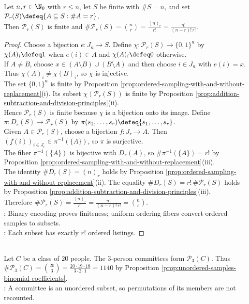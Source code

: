 \begin{proposition} \label{prop:unordered-samples-binomial-coefficients} \\
Let $n,r\in\N_0$ with $r\leq n$, let $S$ be finite with $\#S=n$, and set $\mathcal{P}_r(S)\defeq\{A\subseteq S:\#A=r\}$.\\
Then $\mathcal{P}_r(S)$ is finite and $\#\mathcal{P}_r(S)=\binom{n}{r}=\frac{(n)_r}{r!}=\frac{n!}{(n-r)!\,r!}$.
\begin{proof}
Choose a bijection $e:J_n\to S$. Define $\chi:\mathcal{P}_r(S)\to\{0,1\}^n$ by $\chi(A)_i\defeq1$ when $e(i)\in A$ and $\chi(A)_i\defeq0$ otherwise.\\
If $A\neq B$, choose $x\in(A\setminus B)\cup(B\setminus A)$ and then choose $i\in J_n$ with $e(i)=x$. Thus $\chi(A)_i\neq\chi(B)_i$, so $\chi$ is injective.\\
The set $\{0,1\}^n$ is finite by Proposition \ref{prop:ordered-sampling-with-and-without-replacement}(i). Its subset $\chi(\mathcal{P}_r(S))$ is finite by Proposition \ref{prop:addition-subtraction-and-division-principles}(ii).\\
Hence $\mathcal{P}_r(S)$ is finite because $\chi$ is a bijection onto its image. Define $\pi:D_r(S)\to\mathcal{P}_r(S)$ by $\pi(s_1,\ldots,s_r)\defeq\{s_1,\ldots,s_r\}$.\\
Given $A\in\mathcal{P}_r(S)$, choose a bijection $f:J_r\to A$. Then $(f(i))_{i\in J_r}\in\pi^{-1}(\{A\})$, so $\pi$ is surjective.\\
The fiber $\pi^{-1}(\{A\})$ is bijective with $D_r(A)$, so $\#\pi^{-1}(\{A\})=r!$ by Proposition \ref{prop:ordered-sampling-with-and-without-replacement}(iii).\\
The identity $\#D_r(S)=(n)_r$ holds by Proposition \ref{prop:ordered-sampling-with-and-without-replacement}(ii). The equality $\#D_r(S)=r!\,\#\mathcal{P}_r(S)$ holds by Proposition \ref{prop:addition-subtraction-and-division-principles}(iii).\\
Therefore $\#\mathcal{P}_r(S)=\frac{(n)_r}{r!}=\frac{n!}{(n-r)!\,r!}=\binom{n}{r}$.\\
: Binary encoding proves finiteness; uniform ordering fibers convert ordered samples to subsets.\\
: Each subset has exactly $r!$ ordered listings.
\end{proof}
\end{proposition}

\begin{example} \label{ex:committee-binomial-coefficient} \\
Let $C$ be a class of $20$ people. The $3$-person committees form $\mathcal{P}_3(C)$. Thus $\#\mathcal{P}_3(C)=\binom{20}{3}=\frac{20\cdot19\cdot18}{3\cdot2\cdot1}=1140$ by Proposition \ref{prop:unordered-samples-binomial-coefficients}.\\
: A committee is an unordered subset, so permutations of its members are not recounted.
\end{example}

